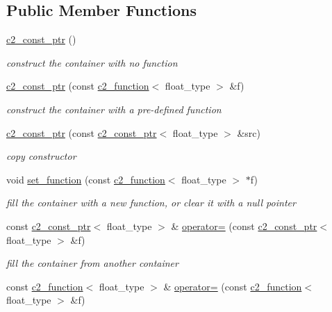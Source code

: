 \subsection*{Public Member Functions}
\begin{DoxyCompactItemize}
\item 
\hyperlink{classc2__const__ptr_a1f5f7e263b82efb9aa96e476c6ec21b1}{c2\+\_\+const\+\_\+ptr} ()
\begin{DoxyCompactList}\small\item\em construct the container with no function \end{DoxyCompactList}\item 
\hyperlink{classc2__const__ptr_a06e14fd555170fcd7c86ab7677961238}{c2\+\_\+const\+\_\+ptr} (const \hyperlink{classc2__function}{c2\+\_\+function}$<$ float\+\_\+type $>$ \&f)
\begin{DoxyCompactList}\small\item\em construct the container with a pre-\/defined function \end{DoxyCompactList}\item 
\hyperlink{classc2__const__ptr_abb60c8d3e444068e5ab618389dc0b82a}{c2\+\_\+const\+\_\+ptr} (const \hyperlink{classc2__const__ptr}{c2\+\_\+const\+\_\+ptr}$<$ float\+\_\+type $>$ \&src)
\begin{DoxyCompactList}\small\item\em copy constructor \end{DoxyCompactList}\item 
void \hyperlink{classc2__const__ptr_a2c7da9e9a936d57b2fb1a3cc7c636523}{set\+\_\+function} (const \hyperlink{classc2__function}{c2\+\_\+function}$<$ float\+\_\+type $>$ $\ast$f)
\begin{DoxyCompactList}\small\item\em fill the container with a new function, or clear it with a null pointer \end{DoxyCompactList}\item 
const \hyperlink{classc2__const__ptr}{c2\+\_\+const\+\_\+ptr}$<$ float\+\_\+type $>$ \& \hyperlink{classc2__const__ptr_a85155ba3652c0a1cba0a6d67d7b386dc}{operator=} (const \hyperlink{classc2__const__ptr}{c2\+\_\+const\+\_\+ptr}$<$ float\+\_\+type $>$ \&f)
\begin{DoxyCompactList}\small\item\em fill the container from another container \end{DoxyCompactList}\item 
const \hyperlink{classc2__function}{c2\+\_\+function}$<$ float\+\_\+type $>$ \& \hyperlink{classc2__const__ptr_a583d8d415ddcad806bbeb09f62ec6df6}{operator=} (const \hyperlink{classc2__function}{c2\+\_\+function}$<$ float\+\_\+type $>$ \&f)

\end{DoxyCompactItemize}
